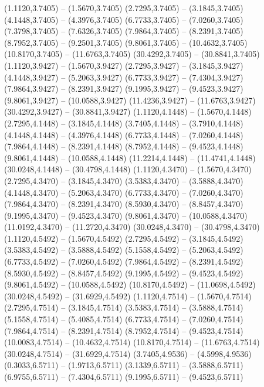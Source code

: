 {\begin{scope}[shift={(#1,#2)}]
    (1.1120,3.7405) -- (1.5670,3.7405)
    (2.7295,3.7405) -- (3.1845,3.7405)
    (4.1448,3.7405) -- (4.3976,3.7405)
    (6.7733,3.7405) -- (7.0260,3.7405)
    (7.3798,3.7405) -- (7.6326,3.7405)
    (7.9864,3.7405) -- (8.2391,3.7405)
    (8.7952,3.7405) -- (9.2501,3.7405)
    (9.8061,3.7405) -- (10.4632,3.7405)
    (10.8170,3.7405) -- (11.6763,3.7405)
    (30.4292,3.7405) -- (30.8841,3.7405)
    (1.1120,3.9427) -- (1.5670,3.9427)
    (2.7295,3.9427) -- (3.1845,3.9427)
    (4.1448,3.9427) -- (5.2063,3.9427)
    (6.7733,3.9427) -- (7.4304,3.9427)
    (7.9864,3.9427) -- (8.2391,3.9427)
    (9.1995,3.9427) -- (9.4523,3.9427)
    (9.8061,3.9427) -- (10.0588,3.9427)
    (11.4236,3.9427) -- (11.6763,3.9427)
    (30.4292,3.9427) -- (30.8841,3.9427)
    (1.1120,4.1448) -- (1.5670,4.1448)
    (2.7295,4.1448) -- (3.1845,4.1448)
    (3.7405,4.1448) -- (3.7910,4.1448)
    (4.1448,4.1448) -- (4.3976,4.1448)
    (6.7733,4.1448) -- (7.0260,4.1448)
    (7.9864,4.1448) -- (8.2391,4.1448)
    (8.7952,4.1448) -- (9.4523,4.1448)
    (9.8061,4.1448) -- (10.0588,4.1448)
    (11.2214,4.1448) -- (11.4741,4.1448)
    (30.0248,4.1448) -- (30.4798,4.1448)
    (1.1120,4.3470) -- (1.5670,4.3470)
    (2.7295,4.3470) -- (3.1845,4.3470)
    (3.5383,4.3470) -- (3.5888,4.3470)
    (4.1448,4.3470) -- (5.2063,4.3470)
    (6.7733,4.3470) -- (7.0260,4.3470)
    (7.9864,4.3470) -- (8.2391,4.3470)
    (8.5930,4.3470) -- (8.8457,4.3470)
    (9.1995,4.3470) -- (9.4523,4.3470)
    (9.8061,4.3470) -- (10.0588,4.3470)
    (11.0192,4.3470) -- (11.2720,4.3470)
    (30.0248,4.3470) -- (30.4798,4.3470)
    (1.1120,4.5492) -- (1.5670,4.5492)
    (2.7295,4.5492) -- (3.1845,4.5492)
    (3.5383,4.5492) -- (3.5888,4.5492)
    (5.1558,4.5492) -- (5.2063,4.5492)
    (6.7733,4.5492) -- (7.0260,4.5492)
    (7.9864,4.5492) -- (8.2391,4.5492)
    (8.5930,4.5492) -- (8.8457,4.5492)
    (9.1995,4.5492) -- (9.4523,4.5492)
    (9.8061,4.5492) -- (10.0588,4.5492)
    (10.8170,4.5492) -- (11.0698,4.5492)
    (30.0248,4.5492) -- (31.6929,4.5492)
    (1.1120,4.7514) -- (1.5670,4.7514)
    (2.7295,4.7514) -- (3.1845,4.7514)
    (3.5383,4.7514) -- (3.5888,4.7514)
    (5.1558,4.7514) -- (5.4085,4.7514)
    (6.7733,4.7514) -- (7.0260,4.7514)
    (7.9864,4.7514) -- (8.2391,4.7514)
    (8.7952,4.7514) -- (9.4523,4.7514)
    (10.0083,4.7514) -- (10.4632,4.7514)
    (10.8170,4.7514) -- (11.6763,4.7514)
    (30.0248,4.7514) -- (31.6929,4.7514)
    (3.7405,4.9536) -- (4.5998,4.9536)
    (0.3033,6.5711) -- (1.9713,6.5711)
    (3.1339,6.5711) -- (3.5888,6.5711)
    (6.9755,6.5711) -- (7.4304,6.5711)
    (9.1995,6.5711) -- (9.4523,6.5711)

\end{scope}}

